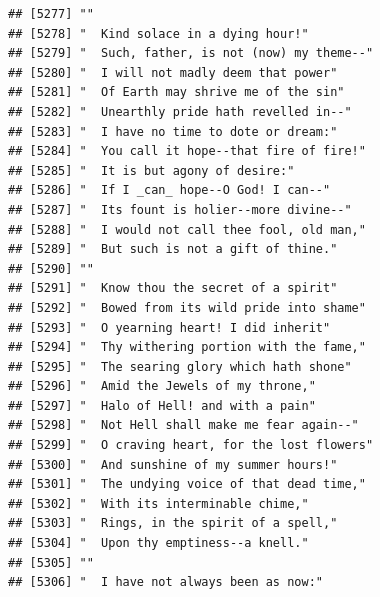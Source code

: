 \documentclass{article}\usepackage[]{graphicx}\usepackage[]{color}
\makeatletter
\newenvironment{kframe}{%
 \def\at@end@of@kframe{}%
 \ifinner\ifhmode%
  \def\at@end@of@kframe{\end{minipage}}%
  \begin{minipage}{\columnwidth}%
 \fi\fi%
 \def\FrameCommand##1{\hskip\@totalleftmargin \hskip-\fboxsep
 \colorbox{shadecolor}{##1}\hskip-\fboxsep
     \hskip-\linewidth \hskip-\@totalleftmargin \hskip\columnwidth}%
 \MakeFramed {\advance\hsize-\width
   \@totalleftmargin\z@ \linewidth\hsize
   \@setminipage}}%
 {\par\unskip\endMakeFramed%
 \at@end@of@kframe}
\newenvironment{knitrout}{}{} %
\makeatother
\begin{document}
\begin{knitrout}
\begin{kframe}
\begin{verbatim}
## [5277] ""                                                                            
## [5278] "  Kind solace in a dying hour!"                                              
## [5279] "  Such, father, is not (now) my theme--"                                     
## [5280] "  I will not madly deem that power"                                          
## [5281] "  Of Earth may shrive me of the sin"                                         
## [5282] "  Unearthly pride hath revelled in--"                                        
## [5283] "  I have no time to dote or dream:"                                          
## [5284] "  You call it hope--that fire of fire!"                                      
## [5285] "  It is but agony of desire:"                                                
## [5286] "  If I _can_ hope--O God! I can--"                                           
## [5287] "  Its fount is holier--more divine--"                                        
## [5288] "  I would not call thee fool, old man,"                                      
## [5289] "  But such is not a gift of thine."                                          
## [5290] ""                                                                            
## [5291] "  Know thou the secret of a spirit"                                          
## [5292] "  Bowed from its wild pride into shame"                                      
## [5293] "  O yearning heart! I did inherit"                                           
## [5294] "  Thy withering portion with the fame,"                                      
## [5295] "  The searing glory which hath shone"                                        
## [5296] "  Amid the Jewels of my throne,"                                             
## [5297] "  Halo of Hell! and with a pain"                                             
## [5298] "  Not Hell shall make me fear again--"                                       
## [5299] "  O craving heart, for the lost flowers"                                     
## [5300] "  And sunshine of my summer hours!"                                          
## [5301] "  The undying voice of that dead time,"                                      
## [5302] "  With its interminable chime,"                                              
## [5303] "  Rings, in the spirit of a spell,"                                          
## [5304] "  Upon thy emptiness--a knell."                                              
## [5305] ""                                                                            
## [5306] "  I have not always been as now:"                                            

\end{verbatim}
\end{kframe}
\end{knitrout}
\end{document}
